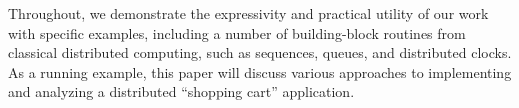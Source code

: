 Throughout, we demonstrate the expressivity
and practical utility of our work with specific examples, including a
number of building-block routines from classical distributed
computing, such as sequences, queues, and distributed clocks.  
As a running example, this paper will discuss various approaches to 
implementing and analyzing a distributed ``shopping cart'' application.

\begin{comment}
\paa{ possibly reuse the below in the 1st para as neil suggests (but as ras recommends
against}

In recent years, there has been a resurgence of interest in Datalog as
the foundation for applied, domain-specific languages in a wide
variety of areas, including networking~\cite{Loo2009-CACM},
distributed systems~\cite{Belaramani:2009,Chu:2007}, natural language
processing~\cite{Eisner:2004}, robotics~\cite{Ashley-Rollman:2007},
compiler analysis~\cite{Lam:2005}, security~\cite{sd3,Li:2003,Zhou:2009}
and computer games~\cite{White:2007}.  The resulting languages have
been promoted for their compact and natural representations of tasks
in their respective domains, in many cases leading to code that is
orders of magnitude shorter than equivalent imperative programs.
Another stated advantage of these languages is the ability to
directly capture intuitive specifications of protocols and programs as
executable code.

While most of these efforts were intended to be ``declarative''
languages, many chose to extend Datalog with operational features
natural to their application domain.  These operational aspects,
though familiar, limit the ability of the language designers to
leverage the rich literature on Datalog: program checks like safety
and stratifiability, and optimizations like magic sets and
materialized recursive view maintenance.  In addition, combining
operational and declarative constructs often
leads to semantic ambiguities.  This is of particular interest to us
in the context of networking and other distributed systems, both
because we have considerable practical experience with these
languages~\cite{boom-eurosys,Loo2009-CACM}, and because others have
examined the semantic ambiguities of these languages in some
depth~\cite{Mao2009,navarro}.\rcs{Furthermore, a wide range of network protocols have already been proven correct in higher level logic languages, such as TLA.  Unfortunately, while these languages are ``executable'' in some sense, they include constructs that cannot be automatically mapped into efficient implementations.}



\end{comment}
